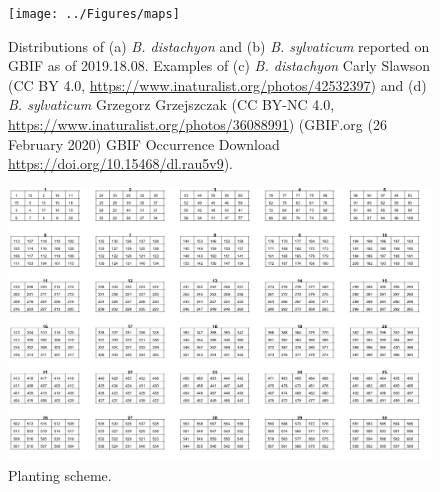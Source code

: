 \documentclass[jou,floatsintext]{apa6}
\begin{document}
\begin{figure}[!h]
\texttt{[image: ../Figures/maps]} \caption{Distributions of (a) \emph{B. distachyon} and (b) \emph{B. sylvaticum} reported on GBIF as of 2019.18.08. Examples of (c) \emph{B. distachyon} Carly Slawson (CC BY 4.0, \url{https://www.inaturalist.org/photos/42532397}) and (d) \emph{B. sylvaticum} Grzegorz Grzejszczak (CC BY-NC 4.0, \url{https://www.inaturalist.org/photos/36088991}) (GBIF.org (26 February 2020) GBIF Occurrence Download \url{https://doi.org/10.15468/dl.rau5v9}).}\label{fig:maps}
\end{figure}



\begin{figure}[!h]
\includegraphics[width=\textwidth]{../Figures/racks_IDs} \caption{Planting scheme.}\label{fig:racks}
\end{figure}
\end{document}

